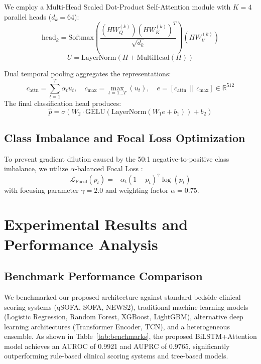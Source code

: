 \documentclass[conference]{IEEEtran}
\begin{document}
We employ a Multi-Head Scaled Dot-Product Self-Attention module with $K = 4$ parallel heads ($d_k = 64$):
\begin{equation}
\text{head}_k = \text{Softmax}\left(\frac{(H W_Q^{(k)})(H W_K^{(k)})^T}{\sqrt{d_k}}\right) (H W_V^{(k)})
\end{equation}
\begin{equation}
U = \text{LayerNorm}(H + \text{MultiHead}(H))
\end{equation}

Dual temporal pooling aggregates the representations:
\begin{equation}
c_{\text{attn}} = \sum_{t=1}^T \alpha_t u_t, \quad c_{\text{max}} = \max_{t=1 \dots T} (u_t), \quad e = [c_{\text{attn}} \,\|\, c_{\text{max}}] \in \mathbb{R}^{512}
\end{equation}
The final classification head produces:
\begin{equation}
\hat{p} = \sigma\left( W_2 \cdot \text{GELU}\left(\text{LayerNorm}(W_1 e + b_1)\right) + b_2 \right)
\end{equation}

\subsection{Class Imbalance and Focal Loss Optimization}
To prevent gradient dilution caused by the 50:1 negative-to-positive class imbalance, we utilize $\alpha$-balanced Focal Loss \cite{lin2017}:
\begin{equation}
\mathcal{L}_{\text{Focal}}(p_t) = -\alpha_t (1 - p_t)^\gamma \log(p_t)
\end{equation}
with focusing parameter $\gamma = 2.0$ and weighting factor $\alpha = 0.75$.

\section{Experimental Results and Performance Analysis}

\subsection{Benchmark Performance Comparison}
We benchmarked our proposed architecture against standard bedside clinical scoring systems (qSOFA, SOFA, NEWS2), traditional machine learning models (Logistic Regression, Random Forest, XGBoost, LightGBM), alternative deep learning architectures (Transformer Encoder, TCN), and a heterogeneous ensemble. As shown in Table~\ref{tab:benchmarks}, the proposed BiLSTM+Attention model achieves an AUROC of 0.9921 and AUPRC of 0.9765, significantly outperforming rule-based clinical scoring systems and tree-based models.
\end{document}
